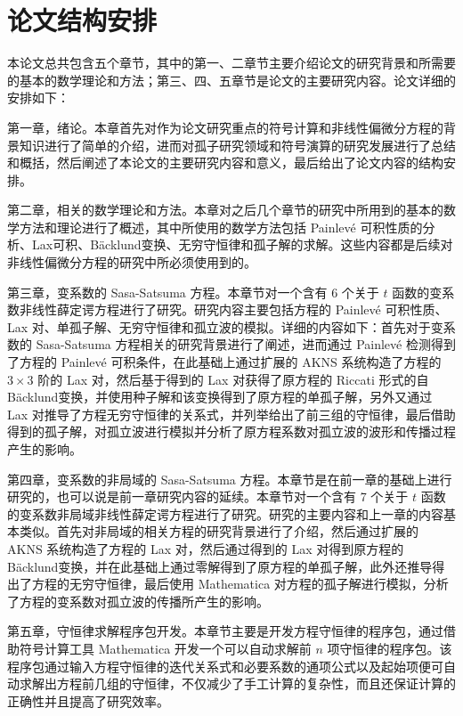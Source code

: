 \section{论文结构安排}
本论文总共包含五个章节，其中的第一、二章节主要介绍论文的研究背景和所需要的基本的数学理论和方法；第三、四、五章节是论文的主要研究内容。论文详细的安排如下：

第一章，绪论。本章首先对作为论文研究重点的符号计算和非线性偏微分方程的背景知识进行了简单的介绍，进而对孤子研究领域和符号演算的研究发展进行了总结和概括，然后阐述了本论文的主要研究内容和意义，最后给出了论文内容的结构安排。

第二章，相关的数学理论和方法。本章对之后几个章节的研究中所用到的基本的数学方法和理论进行了概述，其中所使用的数学方法包括 Painlev\'{e} 可积性质的分析、Lax可积、B\"{a}cklund变换、无穷守恒律和孤子解的求解。这些内容都是后续对非线性偏微分方程的研究中所必须使用到的。

第三章，变系数的 Sasa-Satsuma 方程。本章节对一个含有 6 个关于 $t$ 函数的变系数非线性薛定谔方程进行了研究。研究内容主要包括方程的 Painlev\'{e} 可积性质、Lax 对、单孤子解、无穷守恒律和孤立波的模拟。详细的内容如下：首先对于变系数的 Sasa-Satsuma 方程相关的研究背景进行了阐述，进而通过  Painlev\'{e} 检测得到了方程的  Painlev\'{e} 可积条件，在此基础上通过扩展的 AKNS 系统构造了方程的 $3 \times 3$ 阶的 Lax 对，然后基于得到的 Lax 对获得了原方程的 Riccati 形式的自 B\"{a}cklund变换，并使用种子解和该变换得到了原方程的单孤子解，另外又通过 Lax 对推导了方程无穷守恒律的关系式，并列举给出了前三组的守恒律，最后借助得到的孤子解，对孤立波进行模拟并分析了原方程系数对孤立波的波形和传播过程产生的影响。

第四章，变系数的非局域的 Sasa-Satsuma 方程。本章节是在前一章的基础上进行研究的，也可以说是前一章研究内容的延续。本章节对一个含有 7 个关于 $t$ 函数的变系数非局域非线性薛定谔方程进行了研究。研究的主要内容和上一章的内容基本类似。首先对非局域的相关方程的研究背景进行了介绍，然后通过扩展的 AKNS 系统构造了方程的 Lax 对，然后通过得到的 Lax 对得到原方程的 B\"{a}cklund变换，并在此基础上通过零解得到了原方程的单孤子解，此外还推导得出了方程的无穷守恒律，最后使用 Mathematica 对方程的孤子解进行模拟，分析了方程的变系数对孤立波的传播所产生的影响。

第五章，守恒律求解程序包开发。本章节主要是开发方程守恒律的程序包，通过借助符号计算工具 Mathematica 开发一个可以自动求解前 $n$ 项守恒律的程序包。该程序包通过输入方程守恒律的迭代关系式和必要系数的通项公式以及起始项便可自动求解出方程前几组的守恒律，不仅减少了手工计算的复杂性，而且还保证计算的正确性并且提高了研究效率。












